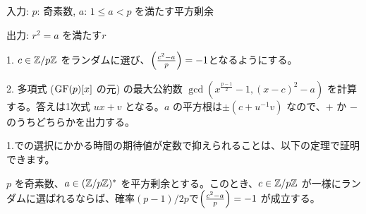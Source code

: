 \documentclass{jsarticle}
\begin{document}
  \begin{algorithm}
   \caption{\cite[Algorithm~3.1]{Karp1991}}
   \label{alg:lehmer-mod-sqrt}
   入力: $p$: 奇素数, $a$: $1 \le a < p$ を満たす平方剰余

   出力: $r^2 = a$ を満たす$r$

   1. $c \in \mathbb{Z}/p\mathbb{Z}$ をランダムに選び、$\left(\frac{c^2-a}{p}\right) = -1$となるようにする。

   2. 多項式 ($\mathrm{GF}(p)[x]$ の元) の最大公約数 $\gcd(x^{\frac{p-1}{2}} - 1, (x-c)^2 - a)$ を計算する。答えは1次式 $ux + v$ となる。$a$ の平方根は$\pm (c + u^{-1}v)$ なので、$+$ か $-$ のうちどちらかを出力する。
  \end{algorithm}

  1.での選択にかかる時間の期待値が定数で抑えられることは、以下の定理で証明できます。
  \begin{theorem}
   \label{thm:abundance-of-witnesses-in-karp1991}
   $p$ を奇素数、$a \in (\mathbb{Z}/p\mathbb{Z})^*$ を平方剰余とする。このとき、$c \in \mathbb{Z}/p\mathbb{Z}$ が一様にランダムに選ばれるならば、確率$(p-1)/2p$で$\left(\frac{c^2-a}{p}\right) = -1$ が成立する。
  \end{theorem}
\end{document}
